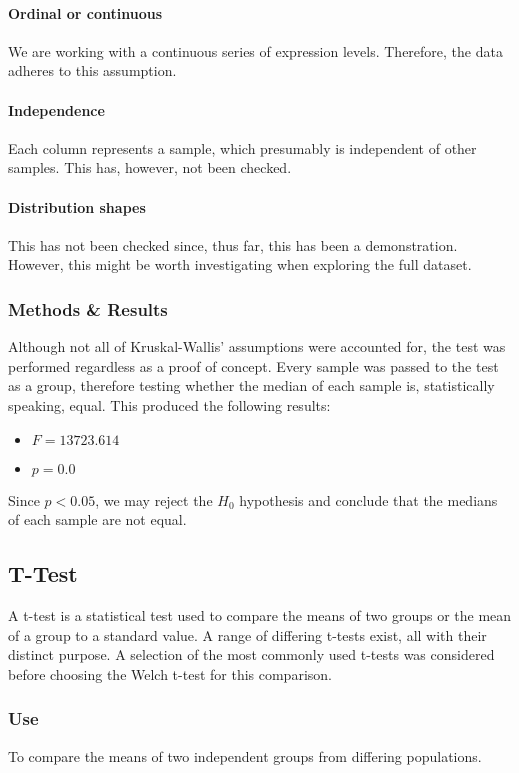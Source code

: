 \paragraph{Ordinal or continuous}
We are working with a continuous series of expression levels.
Therefore, the data adheres to this assumption.

\paragraph{Independence}
Each column represents a sample, which presumably is independent of other samples.
This has, however, not been checked.

\paragraph{Distribution shapes}
This has not been checked since, thus far, this has been a demonstration.
However, this might be worth investigating when exploring the full dataset.

\subsubsection{Methods \& Results}
Although not all of Kruskal-Wallis' assumptions were accounted for, the test was performed regardless as a proof of concept.
Every sample was passed to the test as a group, therefore testing whether the median of each sample is, statistically speaking, equal.
This produced the following results:
\begin{itemize}
    \item $F = 13723.614$
    \item $p = 0.0$
\end{itemize}

Since $p < 0.05$, we may reject the $H_0$ hypothesis and conclude that the medians of each sample are not equal.

\subsection{T-Test}
A t-test is a statistical test used to compare the means of two groups or the mean of a group to a standard value.
A range of differing t-tests exist, all with their distinct purpose.
A selection of the most commonly used t-tests was considered before choosing the Welch t-test for this comparison.

\subsubsection{Use}
To compare the means of two independent groups from differing populations.

